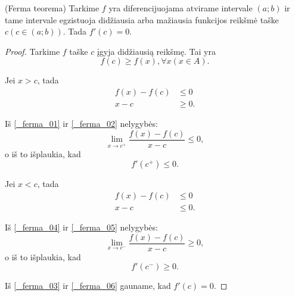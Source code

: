 \begin{prop}
  (Ferma teorema) Tarkime $f$ yra diferencijuojama atvirame intervale
  $(a; b)$ ir tame intervale egzistuoja didžiausia arba mažiausia
  funkcijos reikšmė taške $c (c \in (a; b))$. Tada $f'(c) = 0$.

  \begin{proof}
    Tarkime $f$ taške $c$ įgyja didžiausią reikšmę. Tai yra
    \begin{equation*}
      f(c) \geq f(x), \forall x (x \in A).
    \end{equation*}

    Jei $x > c$, tada 
    \begin{align}
      f(x) - f(c) &\leq 0
      \label{_ferma_01} \\
      x - c &\geq 0
      \label{_ferma_02}.
    \end{align}

    Iš \ref{_ferma_01} ir \ref{_ferma_02} nelygybės:
    \begin{equation*}
      \lim_{x \to c^{+}} \frac{f(x) - f(c)}{x - c} \leq 0,
    \end{equation*}
    o iš to išplaukia, kad
    \begin{equation}
      f'(c^{+}) \leq 0.
      \label{_ferma_03}
    \end{equation}

    Jei $x < c$, tada
    \begin{align}
      f(x) - f(c) &\leq 0
      \label{_ferma_04} \\
      x - c &\leq 0
      \label{_ferma_05}.
    \end{align}

    Iš \ref{_ferma_04} ir \ref{_ferma_05} nelygybės:
    \begin{equation*}
      \lim_{x \to c^{-}} \frac{f(x) - f(c)}{x - c} \geq 0,
    \end{equation*}
    o iš to išplaukia, kad
    \begin{equation}
      f'(c^{-}) \geq 0.
      \label{_ferma_06}
    \end{equation}

    Iš \ref{_ferma_03} ir \ref{_ferma_06} gauname, kad $f'(c) = 0$.
  \end{proof}
\end{prop}

